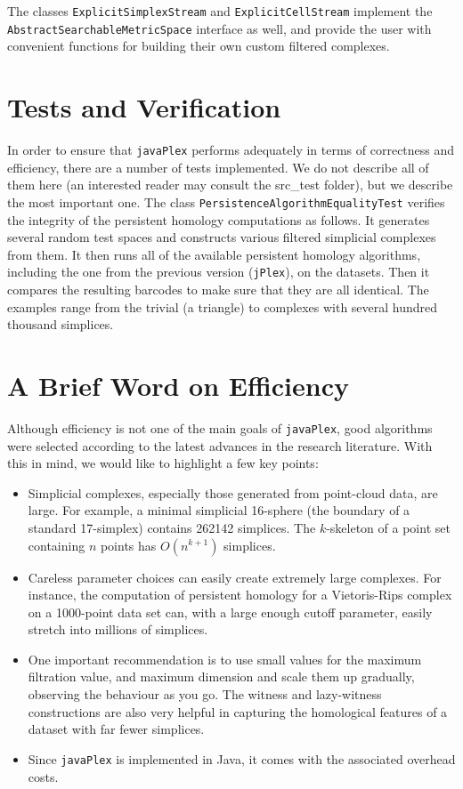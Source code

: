 \documentclass[11pt]{amsart}
\newcommand\jPlex{\texttt{jPlex}\xspace}
\newcommand\javaPlex{\texttt{javaPlex}\xspace}
\begin{document}
The classes  \texttt{ExplicitSimplexStream} and  \texttt{ExplicitCellStream} implement the  \texttt{Abstract\-Searchable\-Metric\-Space} interface as well, and provide the user with convenient functions for building their own custom filtered complexes.

\section{Tests and Verification}

In order to ensure that \javaPlex performs adequately in terms of correctness and efficiency, there are a number of tests implemented. We do not describe all of them here (an interested reader may consult the src\_test folder), but we describe the most important one. The class  \texttt{Persistence\-Algorithm\-Equality\-Test} verifies the integrity of the persistent homology computations as follows. It generates several random test spaces and constructs various filtered simplicial complexes from them. It then runs all of the available persistent homology algorithms, including the one from the previous version (\jPlex), on the datasets. Then it compares the resulting barcodes to make sure that they are all identical. The examples range from the trivial (a triangle) to complexes with several hundred thousand simplices.

\section{A Brief Word on Efficiency}

Although efficiency is not one of the main goals of \javaPlex, good algorithms were selected according to the latest advances in the research literature. With this in mind, we would like to highlight a few key points:

\begin{itemize}
\item Simplicial complexes, especially those generated from point-cloud data, are large. For example, a minimal simplicial 16-sphere (the boundary of a standard 17-simplex) contains 262142 simplices. The $k$-skeleton of a point set containing $n$ points has $O(n^{k+1})$ simplices.
\item Careless parameter choices can easily create extremely large complexes. For instance, the computation of persistent homology for a Vietoris-Rips complex on a 1000-point data set can, with a large enough cutoff parameter, easily stretch into millions of simplices.
\item One important recommendation is to use small values for the maximum filtration value, and maximum dimension and scale them up gradually, observing the behaviour as you go. The witness and lazy-witness constructions are also very helpful in capturing the homological features of a dataset with far fewer simplices.
\item Since \javaPlex is implemented in Java, it comes with the associated overhead costs. 
\end{itemize}
\end{document}

